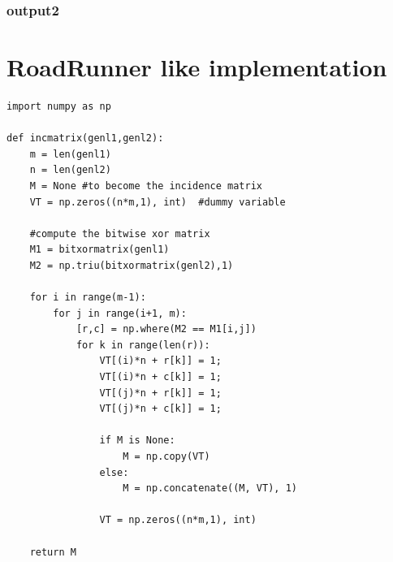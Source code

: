 \documentclass[runningheads]{llncs}
\begin{document}
\subsubsection{output2}
\section{RoadRunner like implementation}
\begin{lstlisting}
import numpy as np
 
def incmatrix(genl1,genl2):
    m = len(genl1)
    n = len(genl2)
    M = None #to become the incidence matrix
    VT = np.zeros((n*m,1), int)  #dummy variable
 
    #compute the bitwise xor matrix
    M1 = bitxormatrix(genl1)
    M2 = np.triu(bitxormatrix(genl2),1) 
 
    for i in range(m-1):
        for j in range(i+1, m):
            [r,c] = np.where(M2 == M1[i,j])
            for k in range(len(r)):
                VT[(i)*n + r[k]] = 1;
                VT[(i)*n + c[k]] = 1;
                VT[(j)*n + r[k]] = 1;
                VT[(j)*n + c[k]] = 1;
 
                if M is None:
                    M = np.copy(VT)
                else:
                    M = np.concatenate((M, VT), 1)
 
                VT = np.zeros((n*m,1), int)
 
    return M
\end{lstlisting}
\end{document}
